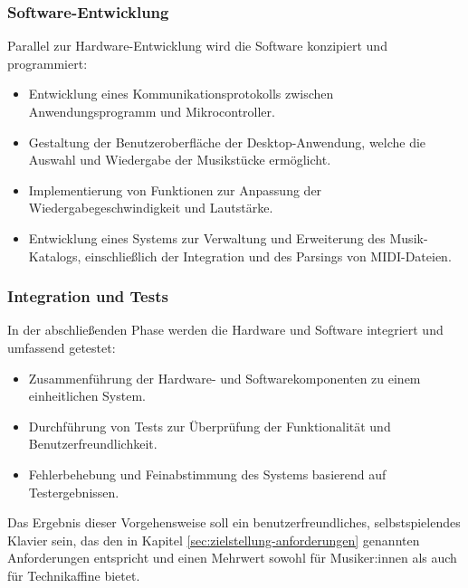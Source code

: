 \subsubsection{Software-Entwicklung}\label{Vorgehensweise - Software-Entwicklung}

Parallel zur Hardware-Entwicklung wird die Software konzipiert und programmiert:

\begin{itemize}
    \item Entwicklung eines Kommunikationsprotokolls zwischen Anwendungsprogramm und Mikrocontroller.
    \item Gestaltung der Benutzeroberfläche der Desktop-Anwendung, welche die Auswahl und Wiedergabe der Musikstücke ermöglicht.
    \item Implementierung von Funktionen zur Anpassung der Wiedergabegeschwindigkeit und Lautstärke.
    \item Entwicklung eines Systems zur Verwaltung und Erweiterung des Musik-Katalogs, einschließlich der Integration und des Parsings von MIDI-Dateien.
\end{itemize}

\subsubsection{Integration und Tests}\label{Vorgehensweise - Integration und Tests}

In der abschließenden Phase werden die Hardware und Software integriert und umfassend getestet:

\begin{itemize}
    \item Zusammenführung der Hardware- und Softwarekomponenten zu einem einheitlichen System.
    \item Durchführung von Tests zur Überprüfung der Funktionalität und Benutzerfreundlichkeit.
    \item Fehlerbehebung und Feinabstimmung des Systems basierend auf Testergebnissen.
\end{itemize}

Das Ergebnis dieser Vorgehensweise soll ein benutzerfreundliches, selbstspielendes Klavier sein,
das den in Kapitel \ref{sec:zielstellung-anforderungen} genannten Anforderungen entspricht und einen Mehrwert sowohl für Musiker:innen als auch für Technikaffine bietet.
